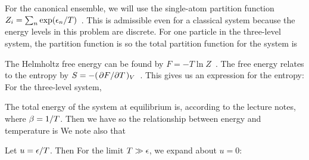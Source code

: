 {	For the canonical ensemble, we will use the single-atom partition function $Z_i = \sum_n \exp(\epsilon_n / T)$~\cite[p.~87]{Landau}.  This is admissible even for a classical system because the energy levels in this problem are discrete.  For one particle in the three-level system, the partition function is
	so the total partition function for the system is
	
	The Helmholtz free energy can be found by $F = -T \ln Z$~\cite[p.~87]{Landau}.  The free energy relates to the entropy by ${S = -(\pdv*{F}{T})_V}$~\cite[p.~47]{Landau}.  This gives us an expression for the entropy:
	For the three-level system,
	
	The total energy of the system at equilibrium is, according to the lecture notes,
	where $\beta = 1 / T$.  Then we have
	so the relationship between energy and temperature is
	We note also that
	
	Let $u = \epsilon / T$.  Then
	For the limit $T \gg \epsilon$, we expand about $u = 0$:
	
}
